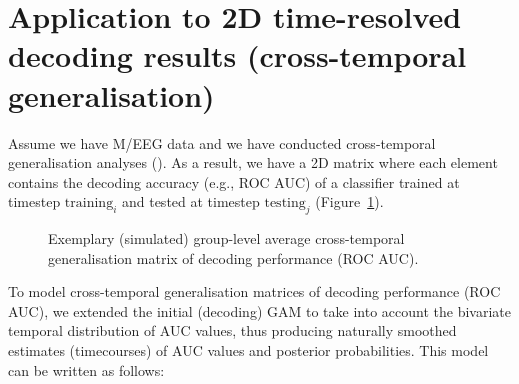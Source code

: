 \documentclass[
  doc,
  floatsintext,
  longtable,
  a4paper,
  nolmodern,
  notxfonts,
  notimes,
  colorlinks=true,linkcolor=blue,citecolor=blue,urlcolor=blue]{apa7}
\begin{document}
\newpage

\appendix

\section{Application to 2D time-resolved decoding results
(cross-temporal
generalisation)}\label{application-to-2d-time-resolved-decoding-results-cross-temporal-generalisation}

Assume we have M/EEG data and we have conducted cross-temporal
generalisation analyses (). As a result, we have a 2D matrix where each element contains the
decoding accuracy (e.g., ROC AUC) of a classifier trained at timestep
\(\text{training}_{i}\) and tested at timestep \(\text{testing}_{j}\)
(Figure~\ref{fig-sim-timegen}).

\begin{figure}[!htb]

\caption{\label{fig-sim-timegen}Exemplary (simulated) group-level
average cross-temporal generalisation matrix of decoding performance
(ROC AUC).}


\end{figure}%

To model cross-temporal generalisation matrices of decoding performance
(ROC AUC), we extended the initial (decoding) GAM to take into account
the bivariate temporal distribution of AUC values, thus producing
naturally smoothed estimates (timecourses) of AUC values and posterior
probabilities. This model can be written as follows:
\end{document}
